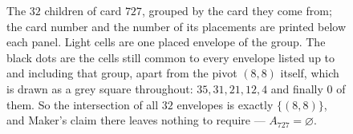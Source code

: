 \begin{figure}[H]
\begin{tikzpicture}[x=1.9mm,y=1.9mm,font=\small]
\end{tikzpicture}
\caption{The $32$ children of card $727$, grouped by the card they come from;
the card number and the number of its placements are printed below each panel.
Light cells are one placed envelope of the group. The black dots are the cells
still common to every envelope listed up to and including that group, apart from
the pivot $(8,8)$ itself, which is drawn as a grey square throughout: $35,31,21,
12,4$ and finally $0$ of them. So the intersection of all $32$ envelopes is
exactly $\{(8,8)\}$, and Maker's claim there leaves nothing to require ---
$A_{727}=\varnothing$.}
\label{fig:topcard}
\end{figure}
